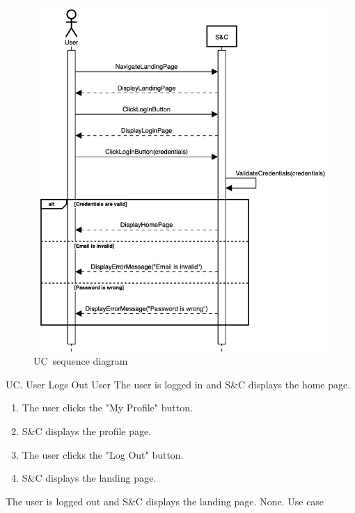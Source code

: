 \begin{figure}
    \centering
    \includegraphics[width=12cm]{images/sequence-diagrams/user-logs-in.png}
    \caption{UC\theuc\ sequence diagram}
\end{figure}


\clearpage

\begin{usecase}
    {UC\theuc. User Logs Out}
    {User}
    {The user is logged in and S\&C displays the home page.}
    {\begin{enumerate}[leftmargin=*]
        \item The user clicks the "My Profile" button.
        \item S\&C displays the profile page.
        \item The user clicks the "Log Out" button.
        \item S\&C displays the landing page.
    \end{enumerate}}
    {The user is logged out and S\&C displays the landing page.}
    {None.}
    {Use case \theuc}
\end{usecase}

